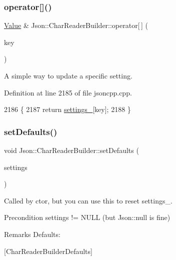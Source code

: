\subsubsection{\texorpdfstring{operator[]()}{operator[]()}}
{\footnotesize\ttfamily \hyperlink{class_json_1_1_value}{Value} \& Json\+::\+Char\+Reader\+Builder\+::operator\mbox{[}$\,$\mbox{]} (\begin{DoxyParamCaption}\item[{\hyperlink{json_8h_a1e723f95759de062585bc4a8fd3fa4be}{J\+S\+O\+N\+C\+P\+P\+\_\+\+S\+T\+R\+I\+NG}}]{key }\end{DoxyParamCaption})}

A simple way to update a specific setting. 

Definition at line 2185 of file jsoncpp.\+cpp.


\begin{DoxyCode}
2186 \{
2187   \textcolor{keywordflow}{return} \hyperlink{class_json_1_1_char_reader_builder_ac69b7911ad64c171c51ebaf2ea26d958}{settings\_}[key];
2188 \}
\end{DoxyCode}
\mbox{\label{class_json_1_1_char_reader_builder_a03ff031e06aabff989ab4addc87294ab}} 
\subsubsection{\texorpdfstring{set\+Defaults()}{setDefaults()}}
{\footnotesize\ttfamily void Json\+::\+Char\+Reader\+Builder\+::set\+Defaults (\begin{DoxyParamCaption}\item[{\hyperlink{class_json_1_1_value}{Json\+::\+Value} $\ast$}]{settings }\end{DoxyParamCaption})\hspace{0.3cm}{\ttfamily [static]}}

Called by ctor, but you can use this to reset settings\+\_\+. \begin{DoxyPrecond}{Precondition}
\textquotesingle{}settings\textquotesingle{} != N\+U\+LL (but Json\+::null is fine) 
\end{DoxyPrecond}
\begin{DoxyRemark}{Remarks}
Defaults\+: 
\begin{DoxyCodeInclude}
\end{DoxyCodeInclude}

\end{DoxyRemark}
\mbox{[}Char\+Reader\+Builder\+Defaults\mbox{]}

